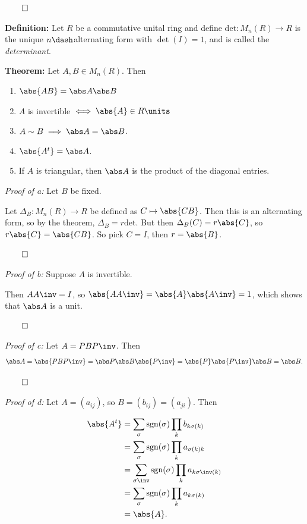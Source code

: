 \(\qed\)

\textbf{Definition:} Let \(R\) be a commutative unital ring and define
\(\mathrm{det}: M_n(R) \to R\) is the unique \(n\dash\)alternating form
with \(\det(I) = 1\), and is called the \emph{determinant}.

\textbf{Theorem:} Let \(A, B \in M_{n}(R)\). Then

\begin{enumerate}
\def\labelenumi{\alph{enumi}.}
\item
  \(\abs{AB} = \abs A \abs B\)
\item
  \(A\) is invertible \(\iff \abs{A} \in R\units\)
\item
  \(A \sim B \implies \abs A = \abs B\).
\item
  \(\abs{A^t} = \abs A\).
\item
  If \(A\) is triangular, then \(\abs A\) is the product of the diagonal
  entries.
\end{enumerate}

\emph{Proof of a:} Let \(B\) be fixed.

Let \(\Delta_B: M_n(R) \to R\) be defined as \(C \mapsto \abs{CB}\).
Then this is an alternating form, so by the theorem,
\(\Delta_B = r \mathrm{det}\). But then \(\Delta_B(C) = r\abs{C}\), so
\(r\abs{C} = \abs{CB}\). So pick \(C = I\), then \(r = \abs{B}\).

\(\qed\)

\emph{Proof of b:} Suppose \(A\) is invertible.

Then \(AA\inv = I\), so \(\abs{AA\inv} = \abs{A}\abs{A\inv} = 1\), which
shows that \(\abs A\) is a unit.

\(\qed\)

\emph{Proof of c:} Let \(A = PBP\inv\). Then
\begin{align*}
\abs A = \abs{PBP\inv} = \abs P \abs B \abs{P\inv} = \abs{P} \abs{P\inv} \abs B = \abs B
.\end{align*}

\(\qed\)

\emph{Proof of d:} Let \(A = (a_{ij})\), so \(B = (b_{ij}) = (a_{ji})\).
Then

\begin{align*}
\abs{A^t}
&= \sum_{\sigma} \mathrm{sgn}(\sigma) \prod_k b_{k \sigma(k)} \\
&= \sum_\sigma \mathrm{sgn}(\sigma) \prod_k a_{\sigma(k) k} \\
&= \sum_{\sigma\inv} \mathrm{sgn}(\sigma) \prod_k a_{k \sigma\inv(k)} \\
&= \sum_\sigma \mathrm{sgn}(\sigma) \prod_k a_{k \sigma(k)} \\
&= \abs {A}
.\end{align*}

